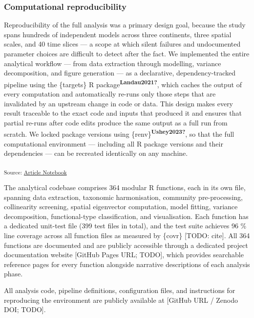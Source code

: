 \documentclass[
  12pt,
]{article}
\begin{document}
\subsubsection{Computational
reproducibility}\label{computational-reproducibility}

Reproducibility of the full analysis was a primary design goal, because
the study spans hundreds of independent models across three continents,
three spatial scales, and 40 time slices --- a scope at which silent
failures and undocumented parameter choices are difficult to detect
after the fact. We implemented the entire analytical workflow --- from
data extraction through modelling, variance decomposition, and figure
generation --- as a declarative, dependency-tracked pipeline using the
\{targets\} R package\textsuperscript{\textbf{Landau2021?}}, which
caches the output of every computation and automatically re-runs only
those steps that are invalidated by an upstream change in code or data.
This design makes every result traceable to the exact code and inputs
that produced it and ensures that partial re-runs after code edits
produce the same output as a full run from scratch. We locked package
versions using \{renv\}\textsuperscript{\textbf{Ushey2023?}}, so that
the full computational environment --- including all R package versions
and their dependencies --- can be recreated identically on any machine.

\textsubscript{Source:
\href{https://OndrejMottl.github.io/BIODYNAMICS-vegetation-cooccurrence/manuscript.qmd.html}{Article
Notebook}}

The analytical codebase comprises 364 modular R functions, each in its
own file, spanning data extraction, taxonomic harmonisation, community
pre-processing, collinearity screening, spatial eigenvector computation,
model fitting, variance decomposition, functional-type classification,
and visualisation. Each function has a dedicated unit-test file (399
test files in total), and the test suite achieves 96 \% line coverage
across all function files as measured by \{covr\} {[}TODO: cite{]}. All
364 functions are documented and are publicly accessible through a
dedicated project documentation website {[}GitHub Pages URL; TODO{]},
which provides searchable reference pages for every function alongside
narrative descriptions of each analysis phase.

All analysis code, pipeline definitions, configuration files, and
instructions for reproducing the environment are publicly available at
{[}GitHub URL / Zenodo DOI; TODO{]}.
\end{document}
